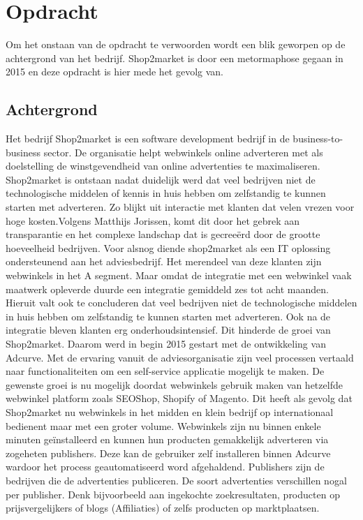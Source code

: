 \chapter{Opdracht}

Om het onstaan van de opdracht te verwoorden wordt een blik geworpen op de achtergrond van het bedrijf. Shop2market is door een metormaphose gegaan in 2015 en deze opdracht is hier mede het gevolg van.

\section{Achtergrond}

Het bedrijf Shop2market is een software development bedrijf in de business-to-business sector. De organisatie helpt webwinkels online adverteren met als doelstelling de winstgevendheid van online advertenties te maximaliseren.
Shop2market is ontstaan nadat duidelijk werd dat veel bedrijven niet de technologische middelen of kennis in huis hebben om zelfstandig te kunnen starten met adverteren. Zo blijkt uit interactie met klanten dat velen vrezen voor hoge kosten.Volgens Matthijs Jorissen, komt dit door het gebrek aan transparantie en het complexe landschap dat is gecreeërd door de grootte hoeveelheid bedrijven.
Voor alsnog diende shop2market als een IT oplossing ondersteunend aan het adviesbedrijf. Het merendeel van deze klanten zijn webwinkels in het A segment. Maar omdat de integratie met een webwinkel vaak maatwerk opleverde duurde een integratie gemiddeld zes tot acht maanden. Hieruit valt ook te concluderen dat veel bedrijven niet de technologische middelen in huis hebben om zelfstandig te kunnen starten met adverteren. Ook na de integratie bleven klanten erg onderhoudsintensief. Dit hinderde de groei van Shop2market.
Daarom werd in begin 2015 gestart met de ontwikkeling van Adcurve. Met de ervaring vanuit de adviesorganisatie zijn veel processen vertaald naar functionaliteiten om een self-service applicatie mogelijk te maken. De gewenste groei is nu mogelijk doordat webwinkels gebruik maken van hetzelfde webwinkel platform zoals SEOShop, Shopify of Magento.  Dit heeft als gevolg dat Shop2market nu webwinkels in het midden en klein bedrijf op internationaal bedienent maar met een groter volume.
Webwinkels zijn nu binnen enkele minuten geïnstalleerd en kunnen hun producten gemakkelijk adverteren via zogeheten publishers. Deze kan de gebruiker zelf installeren binnen Adcurve wardoor het process geautomatiseerd word afgehaldend. Publishers zijn de bedrijven die de advertenties publiceren. De soort advertenties verschillen nogal per publisher. Denk bijvoorbeeld aan ingekochte zoekresultaten, producten op prijsvergelijkers of blogs (Affiliaties) of zelfs producten op marktplaatsen.
